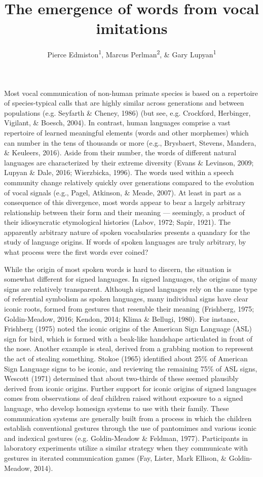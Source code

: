 \documentclass[english,floatsintext,man]{apa6}
\title{The emergence of words from vocal imitations}
\author{Pierce Edmiston\textsuperscript{1}, Marcus Perlman\textsuperscript{2}, \& Gary Lupyan\textsuperscript{1}}
\affiliation{
    \vspace{0.5cm}
          \textsuperscript{1} University of Wisconsin-Madison\\
          \textsuperscript{2} University of Birmingham  }
\theoremstyle{definition}
\theoremstyle{definition}
\theoremstyle{definition}
\theoremstyle{remark}
\begin{document}
\maketitle

\setcounter{secnumdepth}{0}



Most vocal communication of non-human primate species is based on a
repertoire of species-typical calls that are highly similar across
generations and between populations (e.g. Seyfarth \& Cheney, 1986) (but
see, e.g. Crockford, Herbinger, Vigilant, \& Boesch, 2004). In contrast,
human languages comprise a vast repertoire of learned meaningful
elements (words and other morphemes) which can number in the tens of
thousands or more (e.g., Brysbaert, Stevens, Mandera, \& Keuleers,
2016). Aside from their number, the words of different natural languages
are characterized by their extreme diversity (Evans \& Levinson, 2009;
Lupyan \& Dale, 2016; Wierzbicka, 1996). The words used within a speech
community change relatively quickly over generations compared to the
evolution of vocal signals (e.g., Pagel, Atkinson, \& Meade, 2007). At
least in part as a consequence of this divergence, most words appear to
bear a largely arbitrary relationship between their form and their
meaning --- seemingly, a product of their idiosyncratic etymological
histories (Labov, 1972; Sapir, 1921). The apparently arbitrary nature of
spoken vocabularies presents a quandary for the study of language
origins. If words of spoken languages are truly arbitrary, by what
process were the first words ever coined?

While the origin of most spoken words is hard to discern, the situation
is somewhat different for signed languages. In signed languages, the
origins of many signs are relatively transparent. Although signed
languages rely on the same type of referential symbolism as spoken
languages, many individual signs have clear iconic roots, formed from
gestures that resemble their meaning (Frishberg, 1975; Goldin-Meadow,
2016; Kendon, 2014; Klima \& Bellugi, 1980). For instance, Frishberg
(1975) noted the iconic origins of the American Sign Language (ASL) sign
for bird, which is formed with a beak-like handshape articulated in
front of the nose. Another example is steal, derived from a grabbing
motion to represent the act of stealing something. Stokoe (1965)
identified about 25\% of American Sign Language signs to be iconic, and
reviewing the remaining 75\% of ASL signs, Wescott (1971) determined
that about two-thirds of these seemed plausibly derived from iconic
origins. Further support for iconic origins of signed languages comes
from observations of deaf children raised without exposure to a signed
language, who develop homesign systems to use with their family. These
communication systems are generally built from a process in which the
children establish conventional gestures through the use of pantomimes
and various iconic and indexical gestures (e.g. Goldin-Meadow \&
Feldman, 1977). Participants in laboratory experiments utilize a similar
strategy when they communicate with gestures in iterated communication
games (Fay, Lister, Mark Ellison, \& Goldin-Meadow, 2014).
\end{document}
